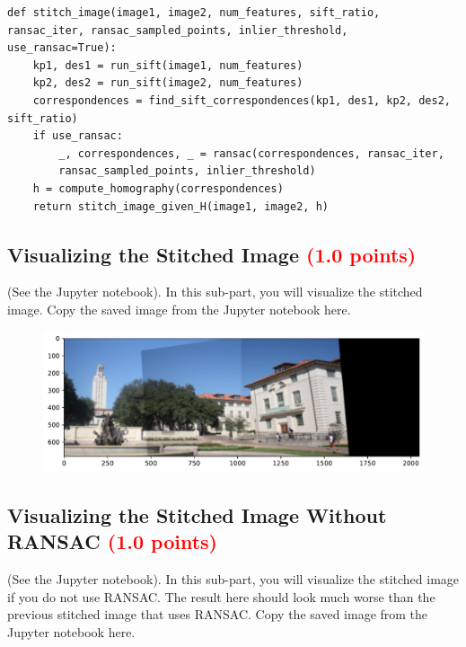 \documentclass[answers]{exam}
\newcommand{\mypoints}[1]{\textcolor{red}{(#1 points)}}
\begin{document}
\begin{solution}
    \begin{verbatim}
def stitch_image(image1, image2, num_features, sift_ratio, ransac_iter, ransac_sampled_points, inlier_threshold, use_ransac=True):
    kp1, des1 = run_sift(image1, num_features)
    kp2, des2 = run_sift(image2, num_features)
    correspondences = find_sift_correspondences(kp1, des1, kp2, des2, sift_ratio)
    if use_ransac:
        _, correspondences, _ = ransac(correspondences, ransac_iter, 
        ransac_sampled_points, inlier_threshold)
    h = compute_homography(correspondences)
    return stitch_image_given_H(image1, image2, h)
\end{verbatim}
\end{solution}

\subsection{Visualizing the Stitched Image \mypoints{1.0}}
(See the Jupyter notebook). In this sub-part, you will visualize the stitched image. Copy the saved image from the Jupyter notebook here.

\begin{solution}
    \begin{figure}[H]
        \centering
        \includegraphics[width=\linewidth]{Data/Solutions/question_3_12.pdf}
    \end{figure}
\end{solution}

\subsection{Visualizing the Stitched Image Without RANSAC \mypoints{1.0}}
(See the Jupyter notebook). In this sub-part, you will visualize the stitched image if you do not use RANSAC. The result here should look much worse than the previous stitched image that uses RANSAC. Copy the saved image from the Jupyter notebook here.
\end{document}
